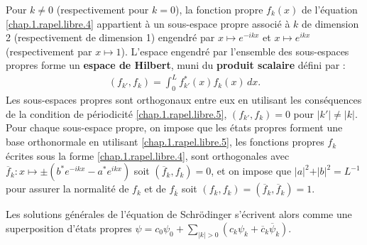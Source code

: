 Pour $k \neq 0 $ (respectivement pour $k = 0$), la fonction propre $f_k(x)$ de l’équation \eqref{chap.1.rapel.libre.4} appartient à un sous-espace propre associé à $k$ de dimension 2 (respectivement de dimension 1) engendré par $x \mapsto e^{-ikx}$ et $x \mapsto e^{ikx}$ (respectivement par $x \mapsto 1$).
L’espace engendré par l’ensemble des sous-espaces propres forme un {\bf espace de Hilbert}, muni du {\bf produit scalaire} défini par :
\begin{eqnarray}
	( f_{k'} , f_{k} ) = \int_0^L f_{k'}^\ast(x) f_{k}(x) \, dx .\label{chap.1.rapel.libre.6}
\end{eqnarray}
Les sous-espaces propres sont orthogonaux entre eux \ie en utilisant les conséquences de la condition de périodicité \eqref{chap.1.rapel.libre.5}, $( f_{k'} , f_{k} ) = 0$ pour $\vert k' \vert \neq \vert k \vert $. 
Pour chaque sous-espace propre, on impose que les états propres forment une base orthonormale \ie en utilisant \eqref{chap.1.rapel.libre.5}, les fonctions propres $f_{k}$ écrites sous la forme \eqref{chap.1.rapel.libre.4}, sont orthogonales avec $\overline{f}_{k} \colon x \mapsto \pm ( b^\ast e^{-ikx} - a^\ast e^{ikx} )$  soit $(\overline{f}_{k} , f_{k} ) = 0$, et on impose que  $ \vert a \vert^2 + \vert b \vert^2 = L^{-1}$ pour assurer la normalité  de $f_{k}$  et de $f_{\overline{k}}$ soit  $( f_{k} , f_{k} ) = (\overline{f}_{k} , \overline{f}_{k})   = 1$. 

\medskip

Les solutions générales de l’équation de Schrödinger s’écrivent alors comme une superposition d’états propres  $\psi = c_0 \psi_0 +  \sum_{\vert k \vert > 0 } (c_k \psi_k  + \overline{c}_{k} \overline{\psi}_{k}) $. 

